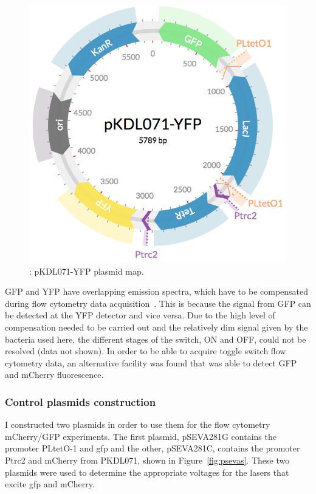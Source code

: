 \begin{figure}[tb]
	\begin{center}
		\includegraphics[scale=0.3]{../../chapters/chapterABCFlow/images/pKDL071-YFP.png}
		\caption[LoF caption]{\label{fig:pkdl071yfp}: pKDL071-YFP plasmid map.  }
	\end{center}
\end{figure}

GFP and YFP have overlapping emission spectra, which have to be compensated during flow cytometry data acquisition~\autocite{Shapiro:1941}. This is because the signal from GFP can be detected at the YFP detector and vice versa. Due to the high level of compensation needed to be carried out and the relatively dim signal given by the bacteria used here, the different stages of the switch, ON and OFF, could not be resolved (data not shown). In order to be able to acquire toggle switch flow cytometry data, an alternative facility was found that was able to detect GFP and mCherry fluorescence. 

\subsubsection{Control plasmids construction}
I constructed two plasmids in order to use them for the flow cytometry mCherry/GFP experiments. The first plasmid, pSEVA281G contains the promoter PLtetO-1 and \acrshort{gfp} and the other, pSEVA281C, contains the promoter Ptrc2 and mCherry from PKDL071, shown in Figure~\ref{fig:psevas}. These two plasmids were used to determine the appropriate voltages for the lasers that excite \acrshort{gfp} and mCherry.

